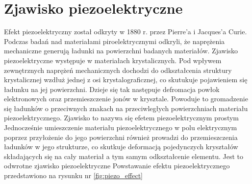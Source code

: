 \chapter{Zjawisko piezoelektryczne }
\label{sec:introduction}

Efekt piezoelektryczny został odkryty w 1880 r. przez Pierre’a i Jacques’a Curie. 
Podczas badań nad materiałami piroelektrycznymi odkryli, że naprężenia mechaniczne
generują ładunki na powierzchni badanych materiałów. Zjawisko piezoelektryczne 
występuje w materiałach krystalicznych. Pod wpływem zewnętrznych naprężeń mechanicznych 
dochodzi do odkształcenia struktury krystalicznej wzdłuż jednej z osi krystalograficznej, 
co skutukuje pojawieniem się ładunku na jej powierzchni. Dzieje się tak 
następuje defromacja powłok elektronowych oraz przemieszczenie jonów w krysztale.
Powoduje to gromadzenie się ładunków o przeciwnych znakach na przeciwległych
powierzchniach materiału piezoelektrycznego. Zjawisko to nazywa się efetem 
piezoelektrycznym prostym \cite{To_Do}
Jednocześnie 
umieszczenie materiału piezoelektrycznego w polu elektrycznym poprzez przyłożenie 
do jego powierzchni również prowadzi do przemieszczenia ładunków w jego strukturze, 
co skutkuje deformacją pojedynczych kryształów składających się na cały materiał a tym 
samym odkształcenie elementu. Jest to odwrotne zjawisko piezoelektryczne \cite{To_Do}
Powstawanie efektu piezoelektrycznego przedstawiono na rysunku nr \ref{fig:piezo_effect}

